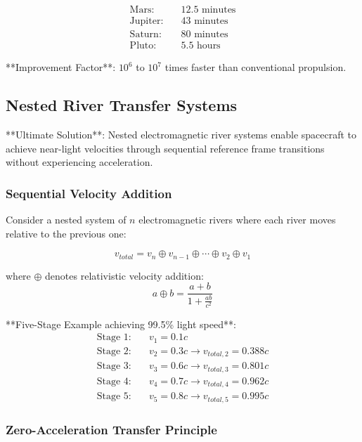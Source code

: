 \documentclass[12pt,a4paper]{article}
\theoremstyle{remark}
\begin{document}
\begin{align}
\text{Mars:} &\quad 12.5 \text{ minutes} \\
\text{Jupiter:} &\quad 43 \text{ minutes} \\
\text{Saturn:} &\quad 80 \text{ minutes} \\
\text{Pluto:} &\quad 5.5 \text{ hours}
\end{align}

**Improvement Factor**: $10^6$ to $10^7$ times faster than conventional propulsion.

\subsection{Nested River Transfer Systems}

**Ultimate Solution**: Nested electromagnetic river systems enable spacecraft to achieve near-light velocities through sequential reference frame transitions without experiencing acceleration.

\subsubsection{Sequential Velocity Addition}

Consider a nested system of $n$ electromagnetic rivers where each river moves relative to the previous one:

\begin{equation}
v_{total} = v_n \oplus v_{n-1} \oplus \cdots \oplus v_2 \oplus v_1
\end{equation}

where $\oplus$ denotes relativistic velocity addition:
\begin{equation}
a \oplus b = \frac{a + b}{1 + \frac{ab}{c^2}}
\end{equation}

**Five-Stage Example achieving 99.5\% light speed**:
\begin{align}
\text{Stage 1:} &\quad v_1 = 0.1c \\
\text{Stage 2:} &\quad v_2 = 0.3c \rightarrow v_{total,2} = 0.388c \\
\text{Stage 3:} &\quad v_3 = 0.6c \rightarrow v_{total,3} = 0.801c \\
\text{Stage 4:} &\quad v_4 = 0.7c \rightarrow v_{total,4} = 0.962c \\
\text{Stage 5:} &\quad v_5 = 0.8c \rightarrow v_{total,5} = 0.995c
\end{align}

\subsubsection{Zero-Acceleration Transfer Principle}
\end{document}
